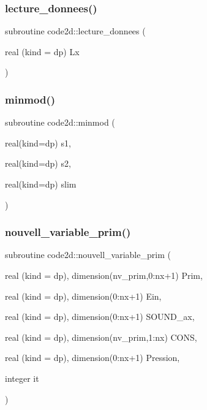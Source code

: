 \mbox{\label{main1DOr2_8f90_a62516b42ea4fb4c0918eb7e43982d4a8}} 
\subsubsection{\texorpdfstring{lecture\+\_\+donnees()}{lecture\_donnees()}}
{\footnotesize\ttfamily subroutine code2d\+::lecture\+\_\+donnees (\begin{DoxyParamCaption}\item[{real (kind = dp)}]{Lx }\end{DoxyParamCaption})}

\mbox{\label{main1DOr2_8f90_a782814db45b1ac79c2d169964b28fd07}} 
\subsubsection{\texorpdfstring{minmod()}{minmod()}}
{\footnotesize\ttfamily subroutine code2d\+::minmod (\begin{DoxyParamCaption}\item[{real(kind=dp)}]{s1,  }\item[{real(kind=dp)}]{s2,  }\item[{real(kind=dp)}]{slim }\end{DoxyParamCaption})}

\mbox{\label{main1DOr2_8f90_aa208014933dc346cd26290f44b072d66}} 
\subsubsection{\texorpdfstring{nouvell\+\_\+variable\+\_\+prim()}{nouvell\_variable\_prim()}}
{\footnotesize\ttfamily subroutine code2d\+::nouvell\+\_\+variable\+\_\+prim (\begin{DoxyParamCaption}\item[{real (kind = dp), dimension(nv\+\_\+prim,0\+:nx+1)}]{Prim,  }\item[{real (kind = dp), dimension(0\+:nx+1)}]{Ein,  }\item[{real (kind = dp), dimension(0\+:nx+1)}]{S\+O\+U\+N\+D\+\_\+ax,  }\item[{real (kind = dp), dimension(nv\+\_\+prim,1\+:nx)}]{C\+O\+NS,  }\item[{real (kind = dp), dimension(0\+:nx+1)}]{Pression,  }\item[{integer}]{it }\end{DoxyParamCaption})}

